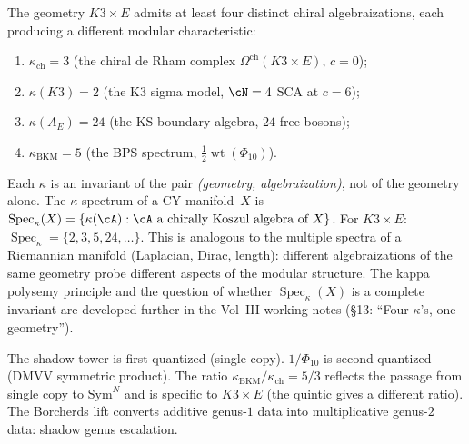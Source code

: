 \begin{remark}
\label{rem:kappa-spectrum-k3xe}
The geometry $K3 \times E$ admits at least four distinct chiral
algebraizations, each producing a different modular characteristic:
\begin{enumerate}[label=\textup{(\roman*)}]
\item $\kappa_{\mathrm{ch}} = 3$ (the chiral de Rham complex
 $\Omega^{\mathrm{ch}}(K3 \times E)$, $c = 0$);
\item $\kappa(K3) = 2$ (the K3 sigma model, $\cN = 4$ SCA at $c = 6$);
\item $\kappa(A_E) = 24$ (the KS boundary algebra, $24$ free bosons);
\item $\kappa_{\mathrm{BKM}} = 5$ (the BPS spectrum,
 $\frac{1}{2}\operatorname{wt}(\Phi_{10})$).
\end{enumerate}
Each $\kappa$ is an invariant of the pair
\emph{(geometry, algebraization)}, not of the geometry alone.
The $\kappa$-spectrum of a CY manifold~$X$ is
$\operatorname{Spec}_\kappa(X) =
\{\kappa(\cA) : \cA \text{ a chirally Koszul algebra of } X\}$.
For $K3 \times E$:
$\operatorname{Spec}_\kappa = \{2, 3, 5, 24, \ldots\}$.
This is analogous to the multiple spectra of a Riemannian
manifold (Laplacian, Dirac, length): different algebraizations
of the same geometry probe different aspects of the modular
structure. The kappa polysemy principle and the question of
whether $\operatorname{Spec}_\kappa(X)$ is a complete invariant
are developed further in the Vol~III working notes
(\S\textup{13}: ``Four $\kappa$'s, one geometry'').
\end{remark}

\begin{remark}
\label{rem:second-quantization-gap}
The shadow tower is first-quantized (single-copy).
$1/\Phi_{10}$ is second-quantized (DMVV symmetric product).
The ratio $\kappa_{\mathrm{BKM}}/\kappa_{\mathrm{ch}} = 5/3$
reflects the passage from single copy to $\mathrm{Sym}^N$
and is specific to $K3 \times E$ (the quintic gives a different
ratio). The Borcherds lift converts additive genus-$1$ data
into multiplicative genus-$2$ data: shadow genus escalation.
\end{remark}

